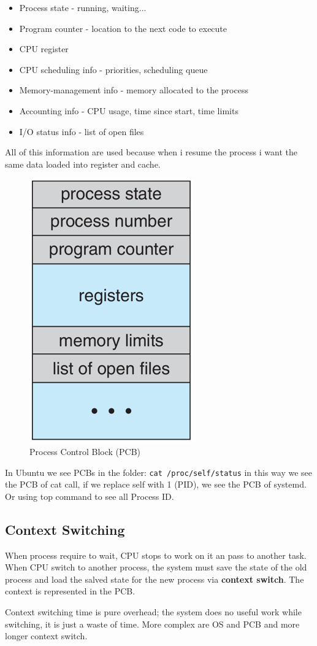 \begin{itemize}
    \item Process state - running, waiting...
    \item Program counter - location to the next code to execute
    \item CPU register 
    \item CPU scheduling info - priorities, scheduling queue
    \item Memory-management info - memory allocated to the process
    \item Accounting info - CPU usage, time since start, time limits
    \item I/O status info - list of open files
\end{itemize}

All of this information are used because when i resume the process i want the same data loaded into register and cache.

\begin{figure}[htbp]
    \centering
    \includegraphics[width=0.17\linewidth]{img/PCB.png}
    \caption{Process Control Block (PCB)}    
\end{figure}

In Ubuntu we see PCBs in the folder: \verb|cat /proc/self/status| in this way we see the PCB of cat call, if we replace self with 1 (PID), we see the PCB of systemd.
Or using top command to see all Process ID.



\subsection{Context Switching}

When process require to wait, CPU stops to work on it an pass to another task. When CPU switch to another process, the system must save the state of the old process and load the salved state for the new process via \textbf{context switch}. The context is represented in the PCB.

Context switching time is pure overhead; the system does no useful work while switching, it is just a waste of time. More complex are OS and PCB and more longer context switch.


